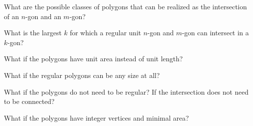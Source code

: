 \documentclass{article}
\begin{document}
\begin{question}
  What are the possible classes of polygons that can be realized as the
  intersection of an $n$-gon and an $m$-gon?
\end{question}

\begin{related}
  \item What is the largest $k$ for which a regular unit $n$-gon and $m$-gon
    can intersect in a $k$-gon?
  \item What if the polygons have unit area instead of unit length?
  \item What if the regular polygons can be any size at all?
  \item What if the polygons do not need to be regular? If the intersection does
    not need to be connected?
  \item What if the polygons have integer vertices and minimal area?
\end{related}
\end{document}
